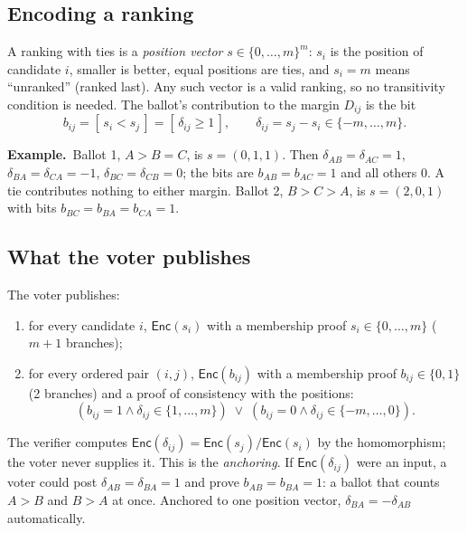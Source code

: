 \documentclass[11pt,a4paper]{article}
\newcommand{\Enc}{\mathsf{Enc}}
\newcommand{\ex}[1]{\par\medskip\noindent\textbf{Example.}~#1\par\medskip}
\theoremstyle{remark}
\begin{document}
\subsection{Encoding a ranking}
A ranking with ties is a \emph{position vector} $s \in \{0, \ldots, m\}^m$:
$s_i$ is the position of candidate $i$, smaller is better, equal positions
are ties, and $s_i = m$ means ``unranked'' (ranked last). Any such vector
is a valid ranking, so no transitivity condition is needed. The ballot's
contribution to the margin $D_{ij}$ is the bit
\[
  b_{ij} = [\, s_i < s_j \,] = [\, \delta_{ij} \ge 1 \,], \qquad
  \delta_{ij} = s_j - s_i \in \{-m, \ldots, m\}.
\]

\ex{Ballot 1, $A > B = C$, is $s = (0, 1, 1)$. Then $\delta_{AB} =
\delta_{AC} = 1$, $\delta_{BA} = \delta_{CA} = -1$, $\delta_{BC} =
\delta_{CB} = 0$; the bits are $b_{AB} = b_{AC} = 1$ and all others $0$. A
tie contributes nothing to either margin. Ballot 2, $B > C > A$, is $s =
(2, 0, 1)$ with bits $b_{BC} = b_{BA} = b_{CA} = 1$.}

\subsection{What the voter publishes}
The voter publishes:
\begin{enumerate}[nosep]
  \item[(P)] for every candidate $i$, $\Enc(s_i)$ with a membership proof
  $s_i \in \{0, \ldots, m\}$ ($m + 1$ branches);
  \item[(B)] for every ordered pair $(i, j)$, $\Enc(b_{ij})$ with a
  membership proof $b_{ij} \in \{0, 1\}$ (2 branches) and a proof of
  consistency with the positions:
  \begin{equation}\label{eq:cons}
    (b_{ij} = 1 \wedge \delta_{ij} \in \{1, \ldots, m\})
    \;\vee\;
    (b_{ij} = 0 \wedge \delta_{ij} \in \{-m, \ldots, 0\}).
  \end{equation}
\end{enumerate}
The verifier computes $\Enc(\delta_{ij}) = \Enc(s_j) / \Enc(s_i)$ by the
homomorphism; the voter never supplies it. This is the \emph{anchoring}. If
$\Enc(\delta_{ij})$ were an input, a voter could post $\delta_{AB} =
\delta_{BA} = 1$ and prove $b_{AB} = b_{BA} = 1$: a ballot that counts $A >
B$ and $B > A$ at once. Anchored to one position vector, $\delta_{BA} =
-\delta_{AB}$ automatically.
\end{document}
